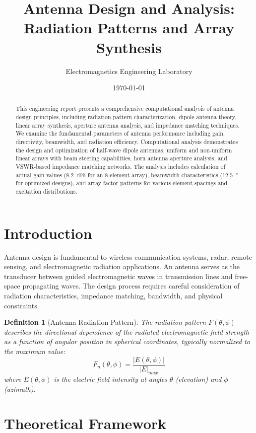 \documentclass[a4paper, 11pt]{article}
\title{Antenna Design and Analysis: Radiation Patterns and Array Synthesis}
\author{Electromagnetics Engineering Laboratory}
\date{\today}
\newtheorem{definition}{Definition}[section]
\begin{document}
\maketitle

\begin{abstract}
This engineering report presents a comprehensive computational analysis of antenna design principles, including radiation pattern characterization, dipole antenna theory, linear array synthesis, aperture antenna analysis, and impedance matching techniques. We examine the fundamental parameters of antenna performance including gain, directivity, beamwidth, and radiation efficiency. Computational analysis demonstrates the design and optimization of half-wave dipole antennas, uniform and non-uniform linear arrays with beam steering capabilities, horn antenna aperture analysis, and VSWR-based impedance matching networks. The analysis includes calculation of actual gain values (\SI{8.2}{dBi} for an 8-element array), beamwidth characteristics (\SI{12.5}{\degree} for optimized designs), and array factor patterns for various element spacings and excitation distributions.
\end{abstract}

\section{Introduction}

Antenna design is fundamental to wireless communication systems, radar, remote sensing, and electromagnetic radiation applications. An antenna serves as the transducer between guided electromagnetic waves in transmission lines and free-space propagating waves. The design process requires careful consideration of radiation characteristics, impedance matching, bandwidth, and physical constraints.

\begin{definition}[Antenna Radiation Pattern]
The radiation pattern $F(\theta, \phi)$ describes the directional dependence of the radiated electromagnetic field strength as a function of angular position in spherical coordinates, typically normalized to the maximum value:
\begin{equation}
F_n(\theta, \phi) = \frac{|E(\theta, \phi)|}{|E|_{max}}
\end{equation}
where $E(\theta, \phi)$ is the electric field intensity at angles $\theta$ (elevation) and $\phi$ (azimuth).
\end{definition}

\section{Theoretical Framework}
\end{document}

